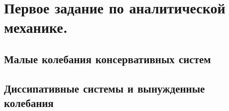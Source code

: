 



\section{Первое задание по аналитической механике.}


\subsection{Малые колебания консервативных систем}



\subsection{Диссипативные системы и вынужденные колебания}


